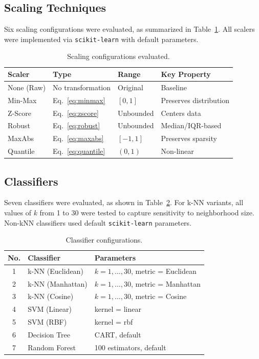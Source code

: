 \documentclass[12pt,a4paper]{article}
\begin{document}
\subsection{Scaling Techniques}
\label{sec:scalers}

Six scaling configurations were evaluated, as summarized in Table~\ref{tbl:scaler-config}. All scalers were implemented via \texttt{scikit-learn} with default parameters.

\begin{table}[ht]
\centering
\caption{Scaling configurations evaluated.}
\label{tbl:scaler-config}
\begin{tabular}{llll}
\toprule
Scaler & Type & Range & Key Property \\
\midrule
None (Raw) & No transformation & Original & Baseline \\
Min-Max    & Eq.~\eqref{eq:minmax} & $[0, 1]$    & Preserves distribution \\
Z-Score    & Eq.~\eqref{eq:zscore} & Unbounded   & Centers data \\
Robust     & Eq.~\eqref{eq:robust} & Unbounded   & Median/IQR-based \\
MaxAbs     & Eq.~\eqref{eq:maxabs} & $[-1, 1]$   & Preserves sparsity \\
Quantile   & Eq.~\eqref{eq:quantile} & $(0, 1)$ & Non-linear \\
\bottomrule
\end{tabular}
\end{table}

\subsection{Classifiers}
\label{sec:classifiers}

Seven classifiers were evaluated, as shown in Table~\ref{tbl:classifiers}. For k-NN variants, all values of $k$ from 1 to 30 were tested to capture sensitivity to neighborhood size. Non-kNN classifiers used default \texttt{scikit-learn} parameters.

\begin{table}[ht]
\centering
\caption{Classifier configurations.}
\label{tbl:classifiers}
\begin{tabular}{cll}
\toprule
No. & Classifier & Parameters \\
\midrule
1 & k-NN (Euclidean) & $k = 1,\dots,30$, metric = Euclidean \\
2 & k-NN (Manhattan) & $k = 1,\dots,30$, metric = Manhattan \\
3 & k-NN (Cosine)    & $k = 1,\dots,30$, metric = Cosine \\
4 & SVM (Linear)     & kernel = linear \\
5 & SVM (RBF)        & kernel = rbf \\
6 & Decision Tree    & CART, default \\
7 & Random Forest    & 100 estimators, default \\
\bottomrule
\end{tabular}
\end{table}
\end{document}
